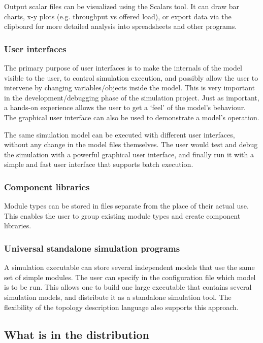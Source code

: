 Output scalar files can be visualized using the Scalars tool.
It can draw bar charts, x-y plots (e.g. throughput vs offered load),
or export data via the clipboard for more detailed analysis into
spreadsheets and other programs.


\subsubsection{User interfaces}

The primary purpose of user interfaces is to make the internals
of the model visible to the user, to control simulation execution,
and possibly allow the user to intervene by changing variables/objects
inside the model. This is very important in the development/debugging
phase of the simulation project. Just as important, a hands-on
experience allows the user to get a `feel' of the model's
behaviour. The graphical user interface can also be used to
demonstrate a model's operation.


The same simulation model can be executed with different user
interfaces, without any change in the model files themselves.
The user would test and debug the simulation with a powerful
graphical user interface, and finally run it with a simple and
fast user interface that supports batch execution.


\subsubsection{Component libraries}

Module types can be stored in files separate from the place
of their actual use. This enables the user to group existing
module types and create component libraries.


\subsubsection{Universal standalone simulation programs}


A simulation executable can store several independent models
that use the same set of simple modules. The user can specify
in the configuration file which model is to be run. This
allows one to build one large executable that contains several
simulation models, and distribute it as a standalone simulation
tool. The flexibility of the topology description language also
supports this approach.


\subsection{What is in the distribution}

